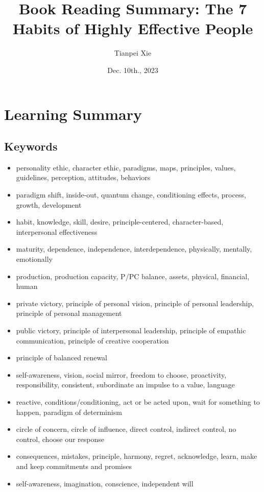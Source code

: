 \documentclass[11pt]{article}
\begin{document}
\title{Book Reading Summary: The 7 Habits of Highly Effective People}
\author{ Tianpei Xie}
\date{Dec. 10th., 2023}
\maketitle
\tableofcontents
\newpage
\section{Learning Summary}
\subsection{Keywords}
\begin{itemize}
\item personality ethic, character ethic, paradigms, maps, principles, values, guidelines,  perception, attitudes, behaviors
\item paradigm shift, inside-out, quantum change, conditioning effects, process,  growth, development
\item habit, knowledge, skill, desire,  principle-centered, character-based, interpersonal effectiveness
\item maturity, dependence, independence, interdependence, physically, mentally, emotionally
\item production, production capacity, P/PC balance, assets, physical, financial, human
\item private victory, principle of personal vision, principle of personal leadership, principle of personal management 
\item public victory, principle of interpersonal leadership, principle of empathic communication, principle of creative cooperation
\item principle of balanced renewal
\item self-awareness, vision, social mirror, freedom to choose, proactivity, responsibility, consistent, subordinate an impulse to a value, language
\item reactive, conditions/conditioning,  act or be acted upon, wait for something to happen, paradigm of determinism
\item circle of concern, circle of influence, direct control, indirect control, no control, choose our response
\item consequences, mistakes, principle, harmony, regret, acknowledge, learn, make and keep commitments and promises
\item self-awareness, imagination, conscience, independent will

\end{itemize}
\end{document}
